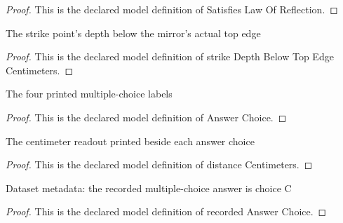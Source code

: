 \begin{proof}
  This is the declared model definition of Satisfies Law Of Reflection.
\end{proof}
\begin{definition}
  \label{def:physics:phyx-mini-0061:phyxminiproblems-problemphyxmini0061-strikedepthbelowtopedgecentimeters}
  The strike point's depth below the mirror's actual top edge
\end{definition}
\begin{proof}
  This is the declared model definition of strike Depth Below Top Edge Centimeters.
\end{proof}
\begin{definition}
  \label{def:physics:phyx-mini-0061:phyxminiproblems-problemphyxmini0061-answerchoice}
  The four printed multiple-choice labels
\end{definition}
\begin{proof}
  This is the declared model definition of Answer Choice.
\end{proof}
\begin{definition}
  \label{def:physics:phyx-mini-0061:phyxminiproblems-problemphyxmini0061-answerchoice-distancecentimeters}
  The centimeter readout printed beside each answer choice
\end{definition}
\begin{proof}
  This is the declared model definition of distance Centimeters.
\end{proof}
\begin{definition}
  \label{def:physics:phyx-mini-0061:phyxminiproblems-problemphyxmini0061-recordedanswerchoice}
  Dataset metadata: the recorded multiple-choice answer is choice C
\end{definition}
\begin{proof}
  This is the declared model definition of recorded Answer Choice.
\end{proof}
